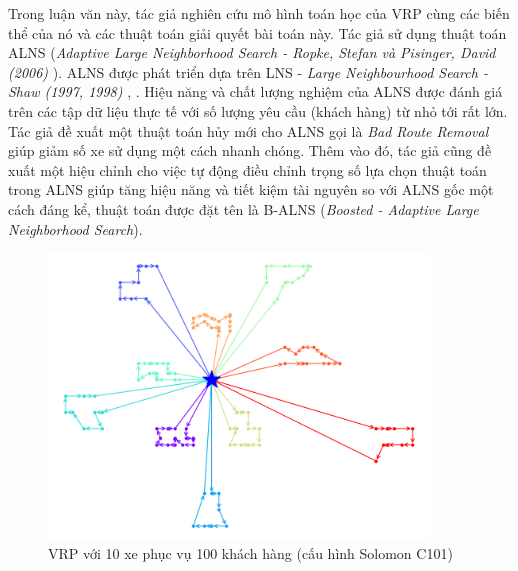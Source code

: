 Trong luận văn này, tác giả nghiên cứu mô hình toán học của VRP cùng các biến thể của nó và các thuật toán giải quyết bài toán này. Tác giả sử dụng thuật toán ALNS (\textit{Adaptive Large Neighborhood Search - Ropke, Stefan và Pisinger, David (2006)} \cite{ropke2006adaptive}). ALNS được phát triển dựa trên LNS - \textit{Large Neighbourhood Search - Shaw (1997, 1998)} \cite{shaw1997new}, \cite{shaw1998using}. Hiệu năng và chất lượng nghiệm của ALNS được đánh giá trên các tập dữ liệu thực tế với số lượng yêu cầu (khách hàng) từ nhỏ tới rất lớn. Tác giả đề xuất một thuật toán hủy mới cho ALNS gọi là \textit{Bad Route Removal} giúp giảm số xe sử dụng một cách nhanh chóng. Thêm vào đó, tác giả cũng đề xuất một hiệu chỉnh cho việc tự động điều chỉnh trọng số lựa chọn thuật toán trong ALNS giúp tăng hiệu năng và tiết kiệm tài nguyên so với ALNS gốc một cách đáng kể, thuật toán được đặt tên là B-ALNS (\textit{Boosted - Adaptive Large Neighborhood Search}).

\begin{figure}[H] %
  \centering %
  \includegraphics[width=0.9\textwidth]{figures/routes_c101.png} 
  \caption{VRP với 10 xe phục vụ 100 khách hàng (cấu hình Solomon C101)} 
\end{figure}

